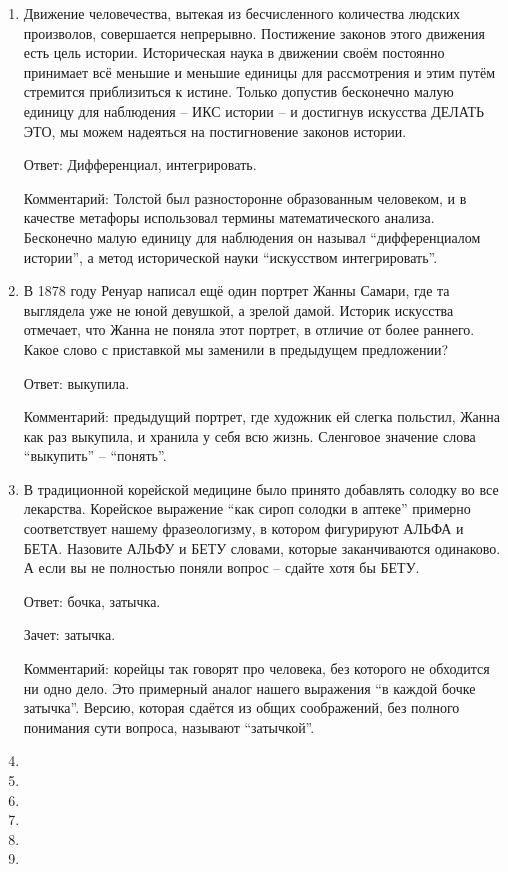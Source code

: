 \documentclass[oneside,final,14pt]{extreport}
\begin{document}
\begin{enumerate}
    Ответ: Алхимиками.

    Комментарий: При проведении опытов алхимики бросали в огонь различные вещества, которые изменяли цвет пламени на зелёный. Церковь подобные увлечения не одобряла.

    \item Движение человечества, вытекая из бесчисленного количества людских произволов, совершается непрерывно. Постижение законов этого движения есть цель истории. Историческая наука в движении своём постоянно принимает всё меньшие и меньшие единицы для рассмотрения и этим путём стремится приблизиться к истине. Только допустив бесконечно малую единицу для наблюдения – ИКС истории – и достигнув искусства ДЕЛАТЬ ЭТО, мы можем надеяться на постигновение законов истории.

    Ответ: Дифференциал, интегрировать.

    Комментарий: Толстой был разносторонне образованным человеком, и в качестве метафоры использовал термины математического анализа. Бесконечно малую единицу для наблюдения он называл “дифференциалом истории”, а метод исторической науки “искусством интегрировать”.

    \item В 1878 году Ренуар написал ещё один портрет Жанны Самари, где та выглядела уже не юной девушкой, а зрелой дамой. Историк искусства отмечает, что Жанна не поняла этот портрет, в отличие от более раннего. Какое слово с приставкой мы заменили в предыдущем предложении?

    Ответ: выкупила.

    Комментарий: предыдущий портрет, где художник ей слегка польстил, Жанна как раз выкупила, и хранила у себя всю жизнь. Сленговое значение слова “выкупить” –  “понять”.

    \item В традиционной корейской медицине было принято добавлять солодку во все лекарства. Корейское выражение “как сироп солодки в аптеке” примерно соответствует нашему фразеологизму, в котором фигурируют АЛЬФА и БЕТА. Назовите АЛЬФУ и БЕТУ словами, которые заканчиваются одинаково. А если вы не полностью поняли вопрос – сдайте хотя бы БЕТУ.

    Ответ: бочка, затычка.

    Зачет: затычка.

    Комментарий: корейцы так говорят про человека, без которого не обходится ни одно дело. Это примерный аналог нашего выражения “в каждой бочке затычка”. Версию, которая сдаётся из общих соображений, без полного понимания сути вопроса, называют “затычкой”.

    \item
    \item
    \item
    \item
    \item
    \item
\end{enumerate}
\end{document}
